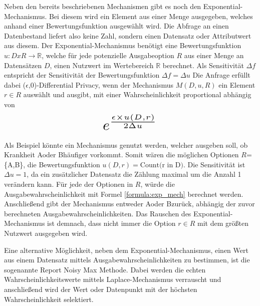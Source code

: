 Neben den bereits beschriebenen Mechanismen gibt es noch den Exponential-Mechanismus. 
Bei diesem wird ein Element aus einer Menge ausgegeben, welches anhand einer Bewertungsfunktion ausgewählt wird.
Die Abfrage an einen Datenbestand liefert also keine Zahl, sondern einen Datensatz oder Attributwert aus diesem.
Der Exponential-Mechanismus benötigt eine Bewertungsfunktion $u:D x R \xrightarrow{} \mathbb{R}$, welche für jede potenzielle Ausgabeoption $R$ aus einer Menge an Datensätzen $D$, einen Nutzwert im Wertebereich $\mathbb{R}$ berechnet.
Als Sensitivität $\Delta f$ entspricht der Sensitivität der Bewertungsfunktion $\Delta f = \Delta u$
Die Anfrage erfüllt dabei ($\epsilon$,0)-Differential Privacy, wenn der Mechanismus $M(D,u,R)$ ein Element $r \in R$ auswählt und ausgibt, mit einer Wahrscheinlichkeit proportional abhängig von
\begin{equation}\label{formula:exp_mech}
\resizebox{!}{0.8cm}{$
    e^{\frac{\epsilon \times u(D,r)}{2\Delta u}}
$}
\end{equation}


Als Beispiel könnte ein Mechanismus genutzt werden, welcher ausgeben soll, ob Krankheit \dq A\dq oder \dq B\dq häufiger vorkommt.
Somit wären die möglichen Optionen $R$=\{\dq A\dq,\dq B\dq\}, die Bewertungsfunktion $u(D,r)=\text{Count(r in D)}$.
Die Sensitivität ist $\Delta u = 1$, da ein zusätzlicher Datensatz die Zählung maximal um die Anzahl 1 verändern kann. 
Für jede der Optionen in $R$, würde die Ausgabewahrscheinlichkeit mit Formel \ref{formula:exp_mech} berechnet werden. 
Anschließend gibt der Mechanismus entweder \dq A\dq oder \dq B\dq zurück, abhängig der zuvor berechneten Ausgabewahrscheinlichkeiten.
Das Rauschen des Exponential-Mechanismus ist demnach, dass nicht immer die Option $r \in R$ mit dem größten Nutzwert ausgegeben wird. 

Eine alternative Möglichkeit, neben dem Exponential-Mechanismus, einen Wert aus einem Datensatz mittels Ausgabewahrscheinlichkeiten zu bestimmen, ist die sogenannte Report Noisy Max Methode. 
Dabei werden die echten Wahrscheinlichkeitswerte mittels Laplace-Mechanismus verrauscht und anschließend wird der Wert oder Datenpunkt mit der höchsten Wahrscheinlichkeit selektiert.


